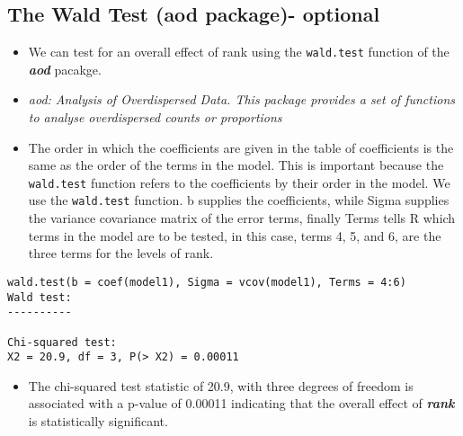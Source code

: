 \documentclass[]{article}
\begin{document}
\subsection{The Wald Test (aod package)- optional}
\begin{itemize}
\item We can test for an overall effect of rank using the \texttt{wald.test} function of the \textbf{\textit{aod}} pacakge. 
\item \textit{aod: Analysis of Overdispersed Data. This package provides a set of functions to analyse overdispersed counts or proportions}
\item The order in which the coefficients are given in the table of coefficients is the same as the order of the terms in the model. This is important because the \texttt{wald.test} function refers to the coefficients by their order in the model. We use the \texttt{wald.test} function. b supplies the coefficients, while Sigma supplies the variance covariance matrix of the error terms, finally Terms tells R which terms in the model are to be tested, in this case, terms 4, 5, and 6, are the three terms for the levels of rank.
\end{itemize}
\begin{framed}
\begin{verbatim}
wald.test(b = coef(model1), Sigma = vcov(model1), Terms = 4:6)
Wald test:
----------

Chi-squared test:
X2 = 20.9, df = 3, P(> X2) = 0.00011
\end{verbatim}
\end{framed}
\begin{itemize}
\item The chi-squared test statistic of 20.9, with three degrees of freedom is associated with a p-value of 0.00011 indicating that the overall effect of \textbf{\textit{rank}} is statistically significant.
\end{itemize}
\newpage
\end{document}
